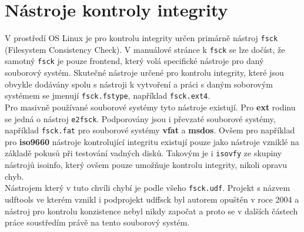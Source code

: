\section{Nástroje kontroly integrity}
V prostředí OS Linux je pro kontrolu integrity určen primárně nástroj \texttt{fsck} (Filesystem Consistency Check). V manuálové stránce k \texttt{fsck} \cite{man-fsck} se lze dočíst, že samotný \texttt{fsck} je pouze frontend, který volá specifické nástroje pro daný souborový systém. Skutečné nástroje určené pro kontrolu integrity, které jsou obvykle dodávány spolu s nástroji k vytvoření a práci s daným soborovým systémem se jmenují \texttt{fsck.fstype}, například \texttt{fsck.ext4}.\\
Pro masivně používané souborové systémy tyto nástroje existují. Pro \textbf{ext} rodinu se jedná o nástroj \texttt{e2fsck}. Podporovány jsou i převzaté souborové systémy, například \texttt{fsck.fat} pro souborové systémy \textbf{vfat} a \textbf{msdos}. Ovšem pro například pro \textbf{iso9660} nástroje kontrolující integritu existují pouze jako nástroje vzniklé na základě pokusů při testování vadných disků. Takovým je i \texttt{isovfy} \cite{man-isovfy} ze skupiny nástrojů isoinfo, který ovšem pouze umožňuje kontrolu integrity, nikoli opravu chyb.\\
Nástrojem který v tuto chvíli chybí je podle všeho \texttt{fsck.udf}. Projekt s názvem udftools \cite{udftools-sourceforge} ve kterém vznikl i podprojekt udffsck byl autorem opuštěn v roce 2004 a nástroj pro kontrolu konzistence nebyl nikdy započat a proto se v dalších částech práce soustředím právě na tento souborový systém. 

